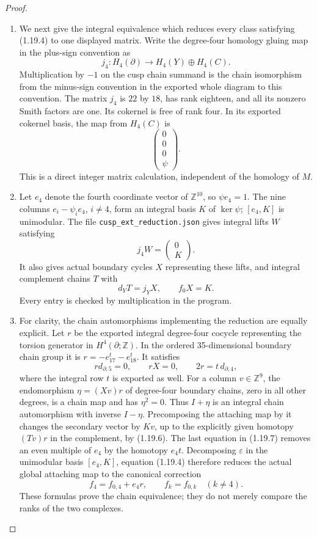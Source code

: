 \begin{proof}
\begin{enumerate}[label=\arabic*.]
\item We next give the integral equivalence which reduces every class
satisfying (1.19.4) to one displayed matrix.  Write the degree-four
homology gluing map in the plus-sign convention as
\[
 j_4:H_4(\partial)\longrightarrow H_4(Y)\oplus H_4(C).
\]
Multiplication by $-1$ on the cusp chain summand is the chain
isomorphism from the minus-sign convention in the exported whole
diagram to this convention.  The matrix $j_4$ is $22$ by $18$,
has rank eighteen, and all its nonzero Smith factors are one.
Its cokernel is free of rank four. In its exported cokernel basis,
the map from $H_4(C)$ is
\[
 \begin{pmatrix}0\\0\\0\\\psi\end{pmatrix}.
\tag{1.19.5}
\]
This is a direct integer matrix calculation, independent of the
homology of $M$.

\item Let $e_4$ denote the fourth coordinate vector of $\mathbb Z^{10}$,
so $\psi e_4=1$.  The nine columns
$e_i-\psi_i e_4$, $i\ne4$, form an integral basis $K$ of $\ker\psi$;
$[e_4,K]$ is unimodular.  The file
\texttt{cusp\_ext\_reduction.json} gives integral lifts $W$ satisfying
\[
 j_4W=\begin{pmatrix}0\\K\end{pmatrix}.
\]
It also gives actual boundary cycles $X$ representing these lifts,
and integral complement chains $T$ with
\[
 d_YT=j_YX,\qquad f_0X=K.
\tag{1.19.6}
\]
Every entry is checked by multiplication in the program.

\item For clarity, the chain automorphisms implementing the reduction
are equally explicit.  Let $r$ be the exported integral degree-four
cocycle representing the torsion generator in $H^4(\partial;\mathbb Z)$.
In the ordered 35-dimensional boundary chain group it is
$r=-e_{17}^{t}-e_{18}^{t}$.  It satisfies
\[
 r d_{\partial,5}=0,\qquad rX=0,
 \qquad 2r=t\,d_{\partial,4},
\tag{1.19.7}
\]
where the integral row $t$ is exported as well.
For a column $v\in\mathbb Z^9$, the endomorphism
$\eta=(Xv)r$ of degree-four boundary chains, zero in all other
degrees, is a chain map and has $\eta^2=0$.
Thus $I+\eta$ is an integral chain automorphism with inverse
$I-\eta$. Precomposing the attaching map by it changes the
secondary vector by $Kv$, up to the explicitly given homotopy
$(Tv)r$ in the complement, by (1.19.6).
The last equation in (1.19.7) removes an even multiple of $e_4$
by the homotopy $e_4t$.  Decomposing $\varepsilon$ in the
unimodular basis $[e_4,K]$, equation (1.19.4) therefore reduces
the actual global attaching map to the canonical correction
\[
 f_4=f_{0,4}+e_4r,
 \qquad f_k=f_{0,k}\quad(k\ne4).
\tag{1.19.8}
\]
These formulas prove the chain equivalence; they do not merely
compare the ranks of the two complexes.


\end{enumerate}
\end{proof}
